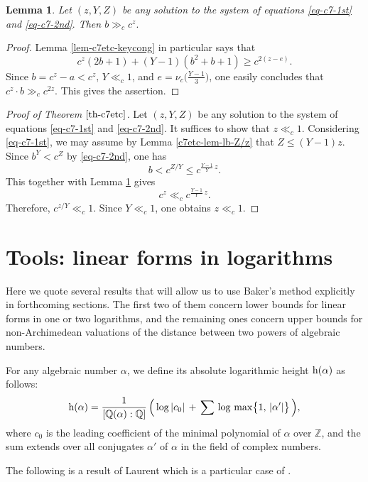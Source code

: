 \documentclass[11pt]{amsart}
\newtheorem{lem}{Lemma}[section]
\numberwithin{equation}{section}
\begin{document}
\begin{lem}\label{c7etc-lem-bl-sharp}
Let $(z,Y,Z)$ be any solution to the system of equations \eqref{eq-c7-1st} and \eqref{eq-c7-2nd}$.$
Then $b \gg_{c} c^z.$
\end{lem}

\begin{proof}
Lemma \ref{lem-c7etc-keycong} in particular says that
\[
c^z (2b+1)+(Y-1)(b^2+b+1) \ge c^{2(z-e)}.
\]
Since $b=c^z-a<c^z,\,Y\ll_c 1$, and $e=\nu_{c}\big(\frac{Y-1}{3}\big)$, one easily concludes that $c^z \cdot b \gg_c c^{2z}$. 
This gives the assertion.
\end{proof}

\begin{proof}[Proof of Theorem $\ref{th-c7etc}$]
Let $(z,Y,Z)$ be any solution to the system of equations \eqref{eq-c7-1st} and \eqref{eq-c7-2nd}$.$
It suffices to show that $z \ll_{c} 1$.
Considering \eqref{eq-c7-1st}, we may assume by Lemma \ref{c7etc-lem-lb-Z/z} that $Z \le (Y-1)z$.
Since $b^Y<c^Z$ by \eqref{eq-c7-2nd}, one has
\[
b<c^{Z/Y} \le c^{\frac{Y-1}{Y}\,z}.
\]
This together with Lemma \ref{c7etc-lem-bl-sharp} gives
\[
c^z \ll_{c} c^{\frac{Y-1}{Y}\,z}.
\] 
Therefore, $c^{z/Y} \ll_{c} 1$. 
Since $Y \ll_c 1$, one obtains $z \ll_{c} 1$.
\end{proof}

\section{Tools: linear forms in logarithms}\label{sec-Baker}

Here we quote several results that will allow us to use Baker's method explicitly in forthcoming sections.
The first two of them concern lower bounds for linear forms in one or two logarithms, and the remaining ones concern upper bounds for non-Archimedean valuations of the distance between two powers of algebraic numbers.

For any algebraic number $\alpha$, we define its absolute logarithmic height ${\rm h}(\alpha)$ as follows:
\[
{\rm h}(\alpha) =\frac{1}{[\mathbb{Q}(\alpha):\mathbb{Q}]}\,\Bigl(\, \log |c_0| \,+ \,\sum \,\log\,\max\bigr\{ 1,\,| \alpha' |\bigr\} \,\Bigl),
\]
where $c_0$ is the leading coefficient of the minimal polynomial of $\alpha$ over $\mathbb Z$, and the sum extends over all conjugates $\alpha'$ of $\alpha$ in the field of complex numbers.

The following is a result of Laurent which is a particular case of \cite[Corollary 2;\,$(m,C_2)=(10,25.2)$]{La}.
\end{document}
